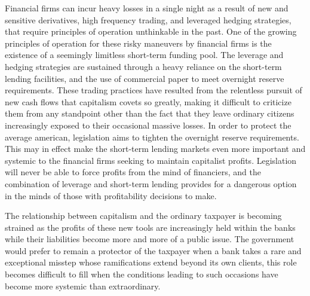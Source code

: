 Financial firms can incur heavy losses in a single night as a result of new and sensitive derivatives, high frequency trading, and leveraged hedging strategies, that require  principles of operation unthinkable in the past.\cite{Kaufman} One of the growing principles of operation for these risky maneuvers by financial firms is the existence of a seemingly limitless short-term funding pool.  The leverage and hedging strategies are sustained through a heavy reliance on the short-term lending facilities, and the use of commercial paper to meet overnight reserve requirements.\cite{Rajan} These trading practices have resulted from the relentless pursuit of new cash flows that capitalism covets so greatly, making it difficult to criticize them from any standpoint other than the fact that they leave ordinary citizens increasingly exposed to their occasional massive losses\cite{Dowd}.  In order to protect the average american, legislation aims to tighten the overnight reserve requirements.\cite{Wilmarth1} This may in effect make the short-term lending markets even more important and systemic to the financial firms seeking to maintain capitalist profits. Legislation will never be able to force profits from the mind of financiers, and the combination of leverage and short-term lending provides for a dangerous option in the minds of those with profitability decisions to make.
  
The relationship between capitalism and the ordinary taxpayer is becoming strained as the profits of these new tools are increasingly held within the banks while their liabilities become more and more of a public issue. The government would prefer to remain a protector of the taxpayer when a bank takes a rare and exceptional misstep whose ramifications extend beyond its own clients, this role becomes difficult to fill when the conditions leading to such occasions have become more systemic than extraordinary.

